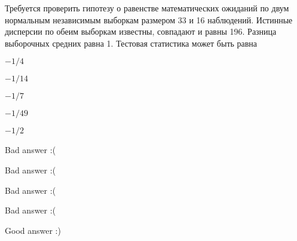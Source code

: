 
\begin{question}
Требуется проверить гипотезу о равенстве математических ожиданий по двум
нормальным независимым выборкам размером 33 и 16 наблюдений. Истинные
дисперсии по обеим выборкам известны, совпадают и равны 196. Разница
выборочных средних равна 1. Тестовая статистика может быть равна
\begin{answerlist}
  \item \(-1/4\)
  \item \(-1/14\)
  \item \(-1/7\)
  \item \(-1/49\)
  \item \(-1/2\)
\end{answerlist}
\end{question}

\begin{solution}
\begin{answerlist}
  \item Bad answer :(
  \item Bad answer :(
  \item Bad answer :(
  \item Bad answer :(
  \item Good answer :)
\end{answerlist}
\end{solution}

